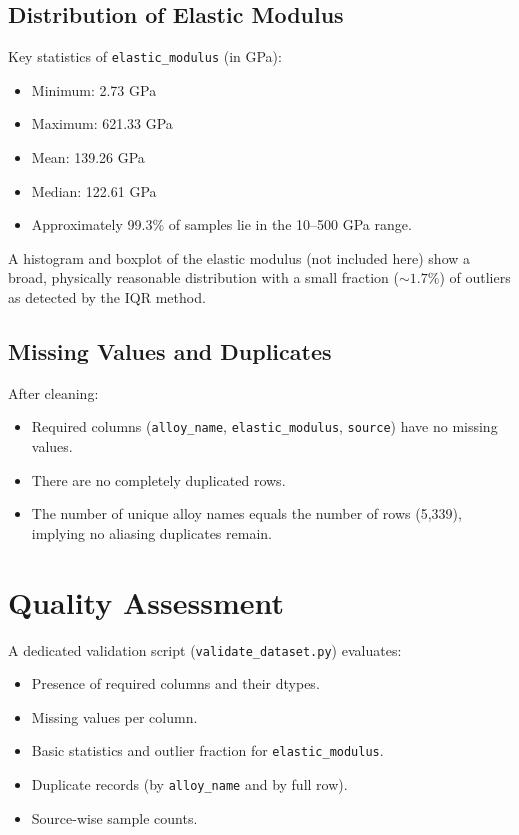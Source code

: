 \documentclass[12pt]{article}
\begin{document}
\subsection{Distribution of Elastic Modulus}
Key statistics of \texttt{elastic\_modulus} (in GPa):
\begin{itemize}
  \item Minimum: 2.73 GPa
  \item Maximum: 621.33 GPa
  \item Mean: 139.26 GPa
  \item Median: 122.61 GPa
  \item Approximately 99.3\% of samples lie in the 10--500 GPa range.
\end{itemize}

A histogram and boxplot of the elastic modulus (not included here) show a broad, physically reasonable distribution with a small fraction (\(\sim 1.7\%\)) of outliers as detected by the IQR method.

\subsection{Missing Values and Duplicates}
After cleaning:
\begin{itemize}
  \item Required columns (\texttt{alloy\_name}, \texttt{elastic\_modulus}, \texttt{source}) have no missing values.
  \item There are no completely duplicated rows.
  \item The number of unique alloy names equals the number of rows (5,339), implying no aliasing duplicates remain.
\end{itemize}

\section{Quality Assessment}
A dedicated validation script (\texttt{validate\_dataset.py}) evaluates:
\begin{itemize}
  \item Presence of required columns and their dtypes.
  \item Missing values per column.
  \item Basic statistics and outlier fraction for \texttt{elastic\_modulus}.
  \item Duplicate records (by \texttt{alloy\_name} and by full row).
  \item Source-wise sample counts.
\end{itemize}
\end{document}
